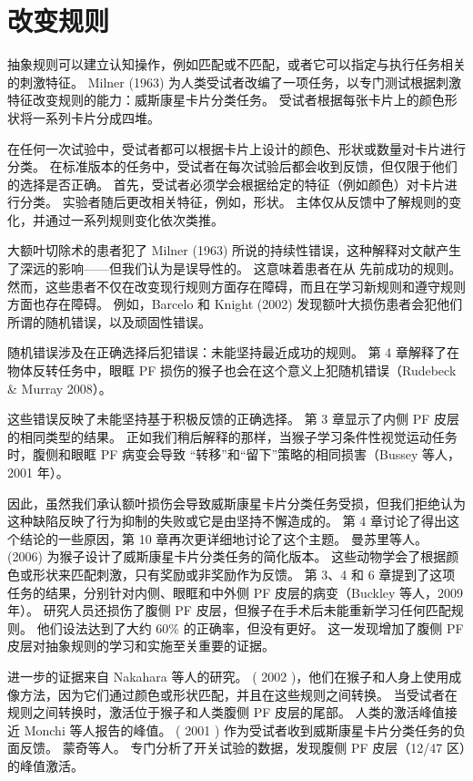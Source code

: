 \section{改变规则}
\par
抽象规则可以建立认知操作，例如匹配或不匹配，或者它可以指定与执行任务相关的刺激特征。 Milner (1963) 为人类受试者改编了一项任务，以专门测试根据刺激特征改变规则的能力：威斯康星卡片分类任务。 受试者根据每张卡片上的颜色形状将一系列卡片分成四堆。
\par
在任何一次试验中，受试者都可以根据卡片上设计的颜色、形状或数量对卡片进行分类。 在标准版本的任务中，受试者在每次试验后都会收到反馈，但仅限于他们的选择是否正确。 首先，受试者必须学会根据给定的特征（例如颜色）对卡片进行分类。 实验者随后更改相关特征，例如，形状。 主体仅从反馈中了解规则的变化，并通过一系列规则变化依次类推。
\par
大额叶切除术的患者犯了 Milner (1963) 所说的持续性错误，这种解释对文献产生了深远的影响——但我们认为是误导性的。 这意味着患者在从
先前成功的规则。 然而，这些患者不仅在改变现行规则方面存在障碍，而且在学习新规则和遵守规则方面也存在障碍。 例如，Barcelo 和 Knight (2002) 发现额叶大损伤患者会犯他们所谓的随机错误，以及顽固性错误。
\par
随机错误涉及在正确选择后犯错误：未能坚持最近成功的规则。 第 4 章解释了在物体反转任务中，眼眶 PF 损伤的猴子也会在这个意义上犯随机错误（Rudebeck \& Murray 2008）。
\par
这些错误反映了未能坚持基于积极反馈的正确选择。 第 3 章显示了内侧 PF 皮层的相同类型的结果。 正如我们稍后解释的那样，当猴子学习条件性视觉运动任务时，腹侧和眼眶 PF 病变会导致
“转移”和“留下”策略的相同损害（Bussey 等人，2001 年）。
\par
因此，虽然我们承认额叶损伤会导致威斯康星卡片分类任务受损，但我们拒绝认为这种缺陷反映了行为抑制的失败或它是由坚持不懈造成的。 第 4 章讨论了得出这个结论的一些原因，第 10 章再次更详细地讨论了这个主题。 曼苏里等人。 (2006) 为猴子设计了威斯康星卡片分类任务的简化版本。 这些动物学会了根据颜色或形状来匹配刺激，只有奖励或非奖励作为反馈。 第 3、4 和 6 章提到了这项任务的结果，分别针对内侧、眼眶和中外侧 PF 皮层的病变（Buckley 等人，2009 年）。 研究人员还损伤了腹侧 PF 皮层，但猴子在手术后未能重新学习任何匹配规则。 他们设法达到了大约 60\% 的正确率，但没有更好。 这一发现增加了腹侧 PF 皮层对抽象规则的学习和实施至关重要的证据。
\par
进一步的证据来自 Nakahara 等人的研究。 ( 2002 )，他们在猴子和人身上使用成像方法，因为它们通过颜色或形状匹配，并且在这些规则之间转换。 当受试者在规则之间转换时，激活位于猴子和人类腹侧 PF 皮层的尾部。 人类的激活峰值接近 Monchi 等人报告的峰值。 ( 2001 ) 作为受试者收到威斯康星卡片分类任务的负面反馈。 蒙奇等人。 专门分析了开关试验的数据，发现腹侧 PF 皮层（12/47 区）的峰值激活。
